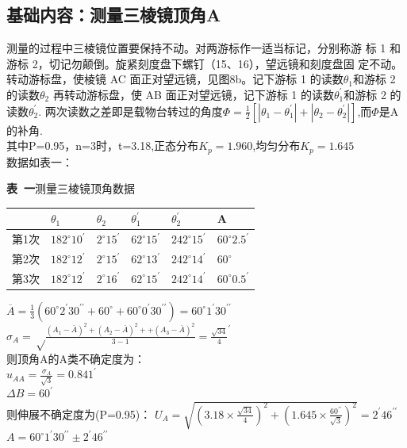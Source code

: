 \documentclass[12pt,a4paper]{article}
\begin{document}
	\subsection{基础内容：测量三棱镜顶角A}
	测量的过程中三棱镜位置要保持不动。对两游标作一适当标记，分别称游
	标 1 和游标 2，切记勿颠倒。旋紧刻度盘下螺钉（15、16），望远镜和刻度盘固
	定不动。转动游标盘，使棱镜 AC 面正对望远镜，见图8b。记下游标 1 的读数$\theta_1$和游标 2 的读数$\theta_2$
	再转动游标盘，使 AB 面正对望远镜，记下游标 1 的读数$\theta_1^{\prime}$和游标 2 的读数$\theta_2^{\prime}$.
	两次读数之差即是载物台转过的角度$\Phi=\frac{1}{2}[\left | \theta_1-\theta_1^{\prime} \right |+\left | \theta_2-\theta_2^{\prime} \right |]$,而$\Phi$是A的补角.\\
	其中P=0.95，n=3时，t=3.18,正态分布$K_{p}=1.960$,均匀分布$K_{p}=1.645$\\
	数据如表一：
	\begin{center}
		\textbf{表\ 一}\quad 测量三棱镜顶角数据  \\[4pt]
		\begin{tabular}{|l|l|l|l|l|l|} \hline
			      & $\theta_{1}$       & $\theta_{2}$       & $\theta_{1}^{\prime}$      & $\theta_2^{\prime}$      & A            						  \\\hline
			第1次 & $182^{\circ}10^{\prime}$ & $2^{\circ}15^{\prime}$ & $62^{\circ}15^{\prime}$ & $242^{\circ}15^{\prime}$  & $60^{\circ}2.5^{\prime}$     \\\hline
			第2次 & $182^{\circ}12^{\prime}$  & $2^{\circ}15^{\prime}$ & $62^{\circ}13^{\prime}$ & $242^{\circ}14^{\prime}$ & $60^{\circ}$ 				\\\hline
			第3次 & $182^{\circ}12^{\prime}$   & $2^{\circ}16^{\prime}$ & $62^{\circ}15^{\prime}$ & $242^{\circ}14^{\prime}$ & $60^{\circ}0.5^{\prime}$ 	\\\hline
		\end{tabular}
	\end{center}
	 $\overline{A}=\frac{1}{3}(60^{\circ}2^{\prime}30^{\prime \prime}+60^{\circ}+60^{\circ}0^{\prime}30^{\prime \prime})=60^{\circ}1^{\prime}30^{\prime \prime}$\\
	 $\sigma_{A}=\sqrt \frac{(A_1-\bar A)^2+(A_2-\bar A)^2++(A_3-\bar A)^2}{3-1}=\frac{\sqrt{34}}{4}^{\prime}$\\
	 则顶角A的A类不确定度为：\\
	 $u_{AA}=\frac{\sigma_{A}}{\sqrt{3}}=0.841^{\prime}$\\
	 $\Delta B=60^{\prime}$\\
	 则伸展不确定度为(P=0.95)：
	 $U_{A}=\sqrt {(3.18\times \frac{\sqrt{34}}{4})^2+(1.645\times \frac{60^{\prime \prime}}{\sqrt 3})^2}=2^{\prime}46^{\prime \prime} $\\
	 $A=60^{\circ}1^{\prime}30^{\prime \prime} \pm 2^{\prime}46^{\prime \prime}$
	 
\end{document}
